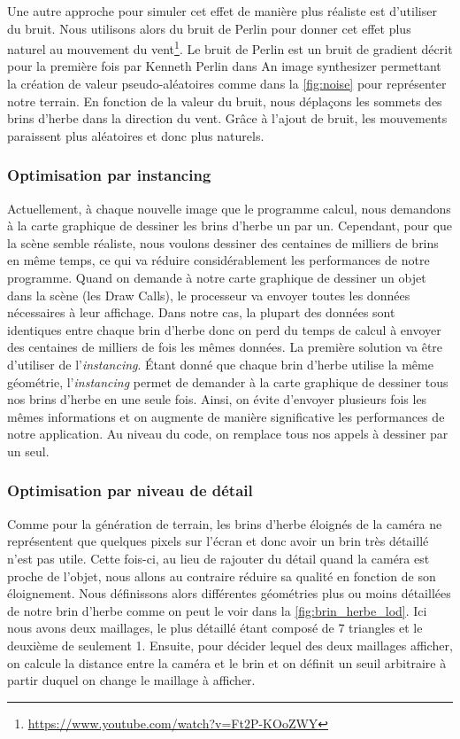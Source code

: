 Une autre approche pour simuler cet effet de manière plus réaliste est d'utiliser du bruit. Nous utilisons alors du bruit de Perlin pour donner cet effet plus naturel au mouvement du vent\footnote{\url{https://www.youtube.com/watch?v=Ft2P-KOoZWY}}. Le bruit de Perlin est un bruit de gradient décrit pour la première fois par Kenneth Perlin dans \og An image synthesizer\fg\citep{perlin} permettant la création de valeur pseudo-aléatoires comme dans la \autoref{fig:noise} pour représenter notre terrain. En fonction de la valeur du bruit, nous déplaçons les sommets des brins d'herbe dans la direction du vent. Grâce à l'ajout de bruit, les mouvements paraissent plus aléatoires et donc plus naturels.

\subsubsection{Optimisation par \og instancing\fg}

Actuellement, à chaque nouvelle image que le programme calcul, nous demandons à la carte graphique de dessiner les brins d'herbe un par un. Cependant, pour que la scène semble réaliste, nous voulons dessiner des centaines de milliers de brins en même temps, ce qui va réduire considérablement les performances de notre programme. Quand on demande à notre carte graphique de dessiner un objet dans la scène (les \og Draw Calls\fg), le processeur va envoyer toutes les données nécessaires à leur affichage. Dans notre cas, la plupart des données sont identiques entre chaque brin d'herbe donc on perd du temps de calcul à envoyer des centaines de milliers de fois les mêmes données.
La première solution va être d'utiliser de l'\textit{instancing}. Étant donné que chaque brin d'herbe utilise la même géométrie, l'\textit{instancing} permet de demander à la carte graphique de dessiner tous nos brins d'herbe en une seule fois. Ainsi, on évite d'envoyer plusieurs fois les mêmes informations et on augmente de manière significative les performances de notre application. Au niveau du code, on remplace tous nos appels à dessiner par un seul.



\subsubsection{Optimisation par niveau de détail}

Comme pour la génération de terrain, les brins d'herbe éloignés de la caméra ne représentent que quelques pixels sur l'écran et donc avoir un brin très détaillé n'est pas utile. Cette fois-ci, au lieu de rajouter du détail quand la caméra est proche de l'objet, nous allons au contraire réduire sa qualité en fonction de son éloignement. Nous définissons alors différentes géométries plus ou moins détaillées de notre brin d'herbe comme on peut le voir dans la \autoref{fig:brin_herbe_lod}. Ici nous avons deux maillages, le plus détaillé étant composé de 7 triangles et le deuxième de seulement 1. Ensuite, pour décider lequel des deux maillages afficher, on calcule la distance entre la caméra et le brin et on définit un seuil arbitraire à partir duquel on change le maillage à afficher.




